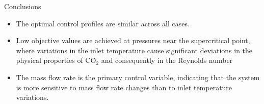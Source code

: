 \documentclass[a0,portrait]{a0poster}
\begin{document}
\begin{multicols}{2}

\begin{tcolorbox}[width=\linewidth, boxrule=0mm, sharp corners=all, colback=white]
	{\LARGE Conclusions\\}

	\begin{itemize}
		\item The optimal control profiles are similar across all cases.
		\item Low objective values are achieved at pressures near the supercritical point, where variations in the inlet temperature cause significant deviations in the physical properties of CO$_2$ and consequently in the Reynolds number
		\item The mass flow rate is the primary control variable, indicating that the system is more sensitive to mass flow rate changes than to inlet temperature variations.
	\end{itemize}

\end{tcolorbox}





\end{multicols}
\end{document}
